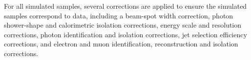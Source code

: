 For all simulated samples, several corrections are applied to ensure the simulated samples correspond to data, including a beam-spot width correction, photon shower-shape and calorimetric isolation corrections, energy scale and resolution corrections, photon identification and isolation corrections, jet selection efficiency corrections, and electron and muon identification, reconstruction and isolation corrections.

\begin{table}[h!]
  \centering
  \caption{Summary of nominal signal samples}
  \label{tab:signal_samples_pyt}
\end{table}

